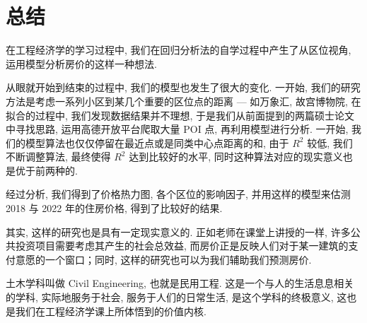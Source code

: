 \section{总结}
在工程经济学的学习过程中, 我们在回归分析法的自学过程中产生了从区位视角, 运用模型分析房价的这样一种想法.

从眼就开始到结束的过程中, 我们的模型也发生了很大的变化.
一开始, 我们的研究方法是考虑一系列小区到某几个重要的区位点的距离 --- 如万象汇, 故宫博物院, 在拟合的过程中, 我们发现数据结果并不理想, 于是我们从前面提到的两篇硕士论文中寻找思路, 运用高德开放平台爬取大量 POI 点, 再利用模型进行分析.
一开始, 我们的模型算法也仅仅停留在最近点或是同类中心点距离的和, 由于 $R^2$ 较低, 我们不断调整算法, 最终使得 $R^2$ 达到比较好的水平, 同时这种算法对应的现实意义也是优于前两种的.

经过分析, 我们得到了价格热力图, 各个区位的影响因子, 并用这样的模型来估测 2018 与 2022 年的住房价格, 得到了比较好的结果.

其实, 这样的研究也是具有一定现实意义的.
正如老师在课堂上讲授的一样, 许多公共投资项目需要考虑其产生的社会总效益, 而房价正是反映人们对于某一建筑的支付意愿的一个窗口；同时, 这样的研究也可以为我们辅助我们预测房价.

土木学科叫做 Civil Engineering, 也就是民用工程.
这是一个与人的生活息息相关的学科, 实际地服务于社会, 服务于人们的日常生活, 是这个学科的终极意义, 这也是我们在工程经济学课上所体悟到的价值内核.
